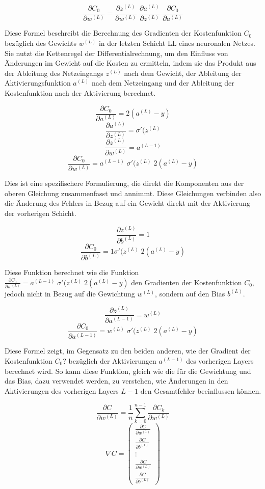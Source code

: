 \[\frac{\partial C_0}{\partial w^{(L)}} = \frac{\partial z^{(L)}}{\partial w^{(L)}}\; \frac{\partial a^{(L)}}{\partial z^{(L)}}\; \frac{\partial C_0}{\partial a^{(L)}}\] %

\noindent Diese Formel beschreibt die Berechnung des Gradienten der Kostenfunktion $C_0$ bezüglich des Gewichts $w^{(L)}$ in der letzten Schicht LL eines neuronalen Netzes. Sie nutzt die Kettenregel der Differentialrechnung, um den Einfluss von Änderungen im Gewicht auf die Kosten zu ermitteln, indem sie das Produkt aus der Ableitung des Netzeingangs $z^{(L)}$ nach dem Gewicht, der Ableitung der Aktivierungsfunktion $a^{(L)}$ nach dem Netzeingang und der Ableitung der Kostenfunktion nach der Aktivierung berechnet.

\[\frac{\partial C_0}{\partial a^{(L)}} = 2(a^{(L)}-y)\]
\[\frac{\partial a^{(L)}}{\partial z^{(L)}} = \sigma '(z^{(L)}\]
\[\frac{\partial z^{(L)}}{\partial w^{(L)}} = a^{(L-1)}\]
\[\frac{\partial C_0}{\partial w^{(L)}} = a^{(L-1)}\; \sigma '(z^{(L)}\; 2(a^{(L)}-y)\]

\noindent Dies ist eine spezifischere Formulierung, die direkt die Komponenten aus der oberen Gleichung zusammenfasst und annimmt. Diese Gleichungen verbinden also die Änderung des Fehlers in Bezug auf ein Gewicht direkt mit der Aktivierung der vorherigen Schicht.

\[\frac{\partial z^{(L)}}{\partial b^{(L)}} = 1\]
\[\frac{\partial C_0}{\partial b^{(L)}} = 1 \sigma '(z^{(L)}\; 2(a^{(L)}-y)\]

\noindent Diese Funktion berechnet wie die Funktion $\frac{\partial C_0}{\partial w^{(L)}} = a^{(L-1)}\; \sigma '(z^{(L)}\; 2(a^{(L)}-y)$ den Gradienten der Kostenfunktion $C_0$, jedoch nicht in Bezug auf die Gewichtung $w^{(L)}$, sondern auf den Bias $b^{(L)}$.

\[\frac{\partial z^{(L)}}{\partial a^{(L-1)}} = w^{(L)}\]
\[\frac{\partial C_0}{\partial a^{(L-1)}} = w^{(L)}\; \sigma '(z^{(L)}\; 2(a^{(L)}-y)\]

\noindent Diese Formel zeigt, im Gegensatz zu den beiden anderen, wie der Gradient der Kostenfunktion $C_0$? bezüglich der Aktivierungen $a^{(L-1)}$ des vorherigen Layers berechnet wird. So kann diese Funktion, gleich wie die für die Gewichtung und das Bias, dazu verwendet werden, zu verstehen, wie Änderungen in den Aktivierungen des vorherigen Layers $L-1$ den Gesamtfehler beeinflussen können.

\[\frac{\partial C}{\partial w^{(L)}} = \frac{1}{n}\sum_{k=0}^{n-1} \frac{\partial C_{k}}{\partial w^{(L)}}\]
\[\nabla C = \left(\begin{array}{c} \frac{\partial C}{\partial w^{(1)}} \\ \frac{\partial C}{\partial b^{(1)}} \\ \vdots \\ \frac{\partial C}{\partial w^{(L)}} \\ \frac{\partial C}{\partial b^{(L)}} \end{array}\right)\] %


